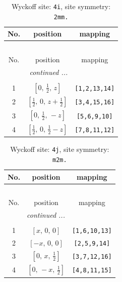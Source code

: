 \documentclass[fleqn,8pt]{jsarticle}
\begin{document}
\renewcommand{\arraystretch}{1.2}
\begin{longtable}{ccc}
\caption{Wyckoff site: {\tt 4i}, site symmetry: {\tt 2mm.}}
 \\
 \hline \hline
No. & position & mapping \\ \hline \endfirsthead

\multicolumn{2}{l}{\tablename\ \thetable{}} \\
 \hline \hline
No. & position & mapping \\ \hline \endhead

 \hline \hline
\multicolumn{2}{r}{\footnotesize\it continued ...} \\ \endfoot

 \hline \hline
\multicolumn{2}{r}{} \\ \endlastfoot

1 & $\left[ 0,\, \frac{1}{2},\, z \right]$ & {\tt [1,2,13,14]} \\ \hline
2 & $\left[ \frac{1}{2},\, 0,\, z + \frac{1}{2} \right]$ & {\tt [3,4,15,16]} \\ \hline
3 & $\left[ 0,\, \frac{1}{2},\, - z \right]$ & {\tt [5,6,9,10]} \\ \hline
4 & $\left[ \frac{1}{2},\, 0,\, \frac{1}{2} - z \right]$ & {\tt [7,8,11,12]} \\
\end{longtable}
\renewcommand{\arraystretch}{1.2}
\begin{longtable}{ccc}
\caption{Wyckoff site: {\tt 4j}, site symmetry: {\tt m2m.}}
 \\
 \hline \hline
No. & position & mapping \\ \hline \endfirsthead

\multicolumn{2}{l}{\tablename\ \thetable{}} \\
 \hline \hline
No. & position & mapping \\ \hline \endhead

 \hline \hline
\multicolumn{2}{r}{\footnotesize\it continued ...} \\ \endfoot

 \hline \hline
\multicolumn{2}{r}{} \\ \endlastfoot

1 & $\left[ x,\, 0,\, 0 \right]$ & {\tt [1,6,10,13]} \\ \hline
2 & $\left[ - x,\, 0,\, 0 \right]$ & {\tt [2,5,9,14]} \\ \hline
3 & $\left[ 0,\, x,\, \frac{1}{2} \right]$ & {\tt [3,7,12,16]} \\ \hline
4 & $\left[ 0,\, - x,\, \frac{1}{2} \right]$ & {\tt [4,8,11,15]} \\
\end{longtable}
\end{document}
